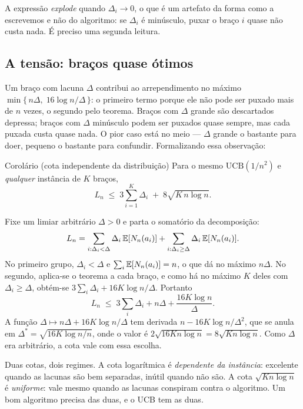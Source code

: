 \documentclass[11pt]{article}
\newcommand{\ucb}{\mathrm{UCB}}
\begin{document}
\begin{alertabox}
A expressão \emph{explode} quando $\Delta_i \to 0$, o que é um artefato da
forma como a escrevemos e não do algoritmo: se $\Delta_i$ é minúsculo, puxar o
braço $i$ quase não custa nada. É preciso uma segunda leitura.
\end{alertabox}

\subsection*{A tensão: braços quase ótimos}

Um braço com lacuna $\Delta$ contribui ao arrependimento no máximo
$\min\{\,n\Delta,\; 16\log n/\Delta\,\}$: o primeiro termo porque ele não pode
ser puxado mais de $n$ vezes, o segundo pelo teorema. Braços com $\Delta$
grande são descartados depressa; braços com $\Delta$ minúsculo podem ser
puxados quase sempre, mas cada puxada custa quase nada. O pior caso está no
meio --- $\Delta$ grande o bastante para doer, pequeno o bastante para
confundir. Formalizando essa observação:

\begin{teobox}{Corolário (cota independente da distribuição)}
Para o mesmo $\ucb(1/n^{2})$ e \emph{qualquer} instância de $K$ braços,
\[
  L_n \;\le\; 3\sum_{i=1}^{K}\Delta_i \;+\; 8\sqrt{K\,n\log n}.
\]
\end{teobox}

\begin{provabox}
Fixe um limiar arbitrário $\Delta > 0$ e parta o somatório da decomposição:
\[
  L_n = \sum_{i:\Delta_i<\Delta}\Delta_i\,\mathbb{E}[N_n(a_i)]
      + \sum_{i:\Delta_i\ge\Delta}\Delta_i\,\mathbb{E}[N_n(a_i)].
\]
No primeiro grupo, $\Delta_i < \Delta$ e $\sum_i \mathbb{E}[N_n(a_i)] = n$, o que dá no
máximo $n\Delta$. No segundo, aplica-se o teorema a cada braço, e como há no
máximo $K$ deles com $\Delta_i \ge \Delta$, obtém-se
$3\sum_i\Delta_i + 16K\log n/\Delta$. Portanto
\[
  L_n \;\le\; 3\sum_i \Delta_i + n\Delta + \frac{16K\log n}{\Delta}.
\]
A função $\Delta \mapsto n\Delta + 16K\log n/\Delta$ tem derivada
$n - 16K\log n/\Delta^{2}$, que se anula em
$\Delta^{*} = \sqrt{16K\log n/n}$, onde o valor é
$2\sqrt{16Kn\log n} = 8\sqrt{Kn\log n}$. Como $\Delta$ era arbitrário, a cota
vale com essa escolha.
\end{provabox}

\begin{ideiabox}
Duas cotas, dois regimes. A cota logarítmica é \emph{dependente da instância}:
excelente quando as lacunas são bem separadas, inútil quando não são. A cota
$\sqrt{Kn\log n}$ é \emph{uniforme}: vale mesmo quando as lacunas conspiram
contra o algoritmo. Um bom algoritmo precisa das duas, e o UCB tem as duas.
\end{ideiabox}
\end{document}
